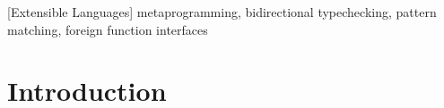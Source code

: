 \documentclass[10pt]{sigplanconf}
\newcommand{\typy}{\texttt{\footnotesize typy}}
\begin{document}
\begin{abstract}
\end{abstract}

[Extensible Languages]
\keywords
metaprogramming, bidirectional typechecking, pattern matching, foreign function interfaces
\section{Introduction}\label{intro}
\end{document}
